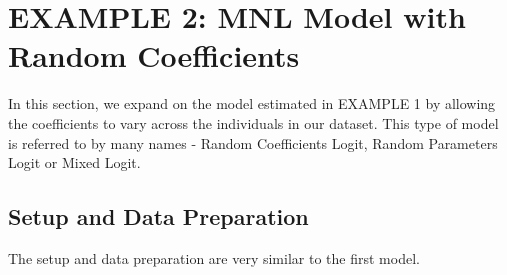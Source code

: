 \documentclass{article}\usepackage[]{graphicx}\usepackage[]{color}
\begin{document}
\section*{EXAMPLE 2: MNL Model with Random Coefficients}

In this section, we expand on the model estimated in EXAMPLE 1 by allowing the coefficients to vary across the individuals in our dataset. This type of model is referred to by many names - Random Coefficients Logit, Random Parameters Logit or Mixed Logit. 

\subsection*{Setup and Data Preparation}

The setup and data preparation are very similar to the first model.
\end{document}
